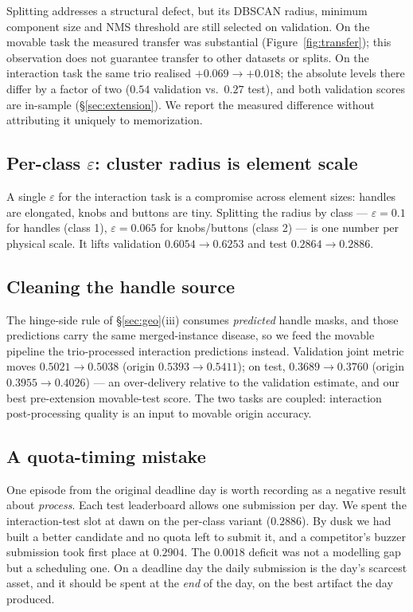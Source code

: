 \documentclass[11pt]{article}
\begin{document}
Splitting addresses a structural defect, but its DBSCAN radius, minimum
component size and NMS threshold are still selected on validation. On the
movable task the measured transfer was substantial
(Figure~\ref{fig:transfer}); this observation does not guarantee transfer
to other datasets or splits.
On the interaction task the same trio realised $+0.069 \to +0.018$; the
absolute levels there differ by a factor of two ($0.54$ validation vs.\
$0.27$ test), and both validation scores are in-sample
(\S\ref{sec:extension}). We report the measured difference without
attributing it uniquely to memorization.

\subsection{Per-class $\varepsilon$: cluster radius is element scale}

A single $\varepsilon$ for the interaction task is a compromise across
element sizes: handles are elongated, knobs and buttons are tiny. Splitting
the radius by class --- $\varepsilon = 0.1$ for handles (class 1),
$\varepsilon = 0.065$ for knobs/buttons (class 2) --- is one number per
physical scale. It lifts validation $0.6054 \to 0.6253$ and test
$0.2864 \to 0.2886$.

\subsection{Cleaning the handle source}

The hinge-side rule of \S\ref{sec:geo}(iii) consumes \emph{predicted} handle
masks, and those predictions carry the same merged-instance disease, so we
feed the movable pipeline the trio-processed interaction predictions
instead. Validation joint metric moves $0.5021 \to 0.5038$ (origin
$0.5393 \to 0.5411$); on test, $0.3689 \to \mathbf{0.3760}$ (origin
$0.3955 \to 0.4026$) --- an over-delivery relative to the validation
estimate, and our best pre-extension movable-test score. The two tasks are
coupled:
interaction post-processing quality is an input to movable origin
accuracy.

\subsection{A quota-timing mistake}

One episode from the original deadline day is worth recording as a negative
result about \emph{process}. Each test leaderboard allows one submission per
day. We spent the interaction-test slot at dawn on the per-class variant
($0.2886$). By dusk we had built a better candidate and no quota left to
submit it, and a competitor's buzzer submission took first place at
$0.2904$. The $0.0018$ deficit was not a modelling gap but a scheduling one.
On a deadline day the daily submission is the day's scarcest asset, and it
should be spent at the \emph{end} of the day, on the best artifact the day
produced.
\end{document}
